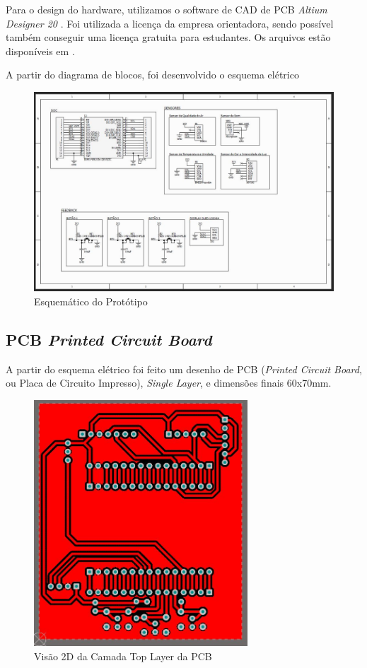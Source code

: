 \documentclass[../monografia.tex]{subfiles}
\begin{document}
Para o design do hardware, utilizamos o software de CAD de PCB \textit{Altium Designer 20} \cite{altium}. Foi utilizada a licença da empresa orientadora, sendo possível também conseguir uma licença gratuita para estudantes. Os arquivos estão disponíveis em \cite{git_hw}. 

A partir do diagrama de blocos, foi desenvolvido o esquema elétrico

\begin{figure}[h]
\includegraphics[width=\textwidth]{sch}
\caption{Esquemático do Protótipo}
\label{fig:img2}
\end{figure}

\subsection{PCB \textit{Printed Circuit Board}}

A partir do esquema elétrico foi feito um desenho de PCB (\textit{Printed Circuit Board}, ou Placa de Circuito Impresso), \textit{Single Layer}, e dimensões finais 60x70mm. 

\begin{figure}[h!]
\centering
\includegraphics[width=8cm]{pcb_2}
\caption{Visão 2D da Camada Top Layer da PCB}
\label{fig:img3}
\end{figure}
\end{document}
